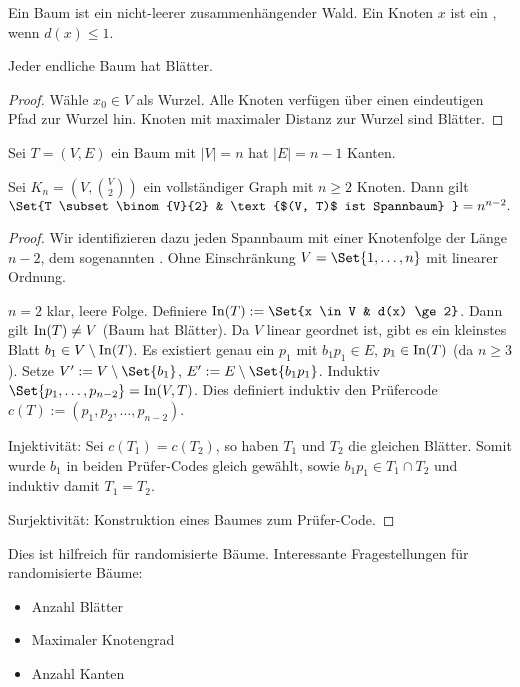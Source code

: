 Ein Baum ist ein nicht-leerer zusammenhängender Wald.
Ein Knoten $x$ ist ein , wenn $d(x) \le 1$.

\begin{lem}
    Jeder endliche Baum hat Blätter.
    \begin{proof}
        Wähle $x_0 \in V$ als Wurzel.
        Alle Knoten verfügen über einen eindeutigen Pfad zur Wurzel hin.
        Knoten mit maximaler Distanz zur Wurzel sind Blätter.
    \end{proof}
\end{lem}

\begin{kor}
    Sei $T = (V, E)$ ein Baum mit $|V| = n$ hat $|E| = n-1$ Kanten.
\end{kor}

\begin{st}
    Sei $K_n = (V, \binom{V}{2})$ ein vollständiger Graph mit $n \ge 2$ Knoten.
    Dann gilt
    \begin{math}
        \Set{T \subset \binom{V}{2} & \text{$(V, T)$ ist Spannbaum} } = n^{n-2}.
    \end{math}
    \begin{proof}
        Wir identifizieren dazu jeden Spannbaum mit einer Knotenfolge der Länge $n-2$, dem sogenannten .
        Ohne Einschränkung $V = \Set{1, \dotsc, n}$ mit linearer Ordnung.

        $n = 2$ klar, leere Folge.
        Definiere $\In(T) := \Set{x \in V & d(x) \ge 2}$.
        Dann gilt $\operatorname{In}(T) \neq V$ (Baum hat Blätter).
        Da $V$ linear geordnet ist, gibt es ein kleinstes Blatt $b_1 \in V \setminus \operatorname{In}(T)$.
        Es existiert genau ein $p_1$ mit $b_1p_1 \in E$, $p_1 \in \operatorname{In}(T)$ (da $n \ge 3$).
        Setze $V' := V \setminus \Set{b_1}$, $E' := E \setminus \Set{b_1p_1}$.
        Induktiv $\Set{p_1, \dotsc, p_{n-2}} = \In(V, T)$.
        Dies definiert induktiv den Prüfercode $c(T) := (p_1, p_2, \dotsc, p_{n-2})$.

        Injektivität: Sei $c(T_1) = c(T_2)$, so haben $T_1$ und $T_2$ die gleichen Blätter.
        Somit wurde $b_1$ in beiden Prüfer-Codes gleich gewählt, sowie $b_1 p_1 \in T_1 \cap T_2$ und induktiv damit $T_1 = T_2$.

        Surjektivität: Konstruktion eines Baumes zum Prüfer-Code.
    \end{proof}
\end{st}

\begin{note}
    Dies ist hilfreich für randomisierte Bäume.
    Interessante Fragestellungen für randomisierte Bäume:
    \begin{itemize}
        \item
            Anzahl Blätter
        \item
            Maximaler Knotengrad
        \item
            Anzahl Kanten
    \end{itemize}
\end{note}



